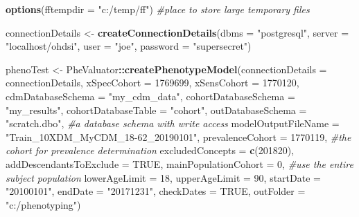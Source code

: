 \documentclass[
]{article}
\newenvironment{Shaded}{\begin{snugshade}}{\end{snugshade}}
\newcommand{\CommentTok}[1]{\textcolor[rgb]{0.56,0.35,0.01}{\textit{#1}}}
\newcommand{\DataTypeTok}[1]{\textcolor[rgb]{0.13,0.29,0.53}{#1}}
\newcommand{\DecValTok}[1]{\textcolor[rgb]{0.00,0.00,0.81}{#1}}
\newcommand{\KeywordTok}[1]{\textcolor[rgb]{0.13,0.29,0.53}{\textbf{#1}}}
\newcommand{\NormalTok}[1]{#1}
\newcommand{\OperatorTok}[1]{\textcolor[rgb]{0.81,0.36,0.00}{\textbf{#1}}}
\newcommand{\OtherTok}[1]{\textcolor[rgb]{0.56,0.35,0.01}{#1}}
\newcommand{\StringTok}[1]{\textcolor[rgb]{0.31,0.60,0.02}{#1}}
\begin{document}
\begin{Shaded}
\begin{Highlighting}[]
\KeywordTok{options}\NormalTok{(}\DataTypeTok{fftempdir =} \StringTok{"c:/temp/ff"}\NormalTok{) }\CommentTok{#place to store large temporary files}

\NormalTok{connectionDetails <-}\StringTok{ }\KeywordTok{createConnectionDetails}\NormalTok{(}\DataTypeTok{dbms =} \StringTok{"postgresql"}\NormalTok{,}
                                              \DataTypeTok{server =} \StringTok{"localhost/ohdsi"}\NormalTok{,}
                                              \DataTypeTok{user =} \StringTok{"joe"}\NormalTok{,}
                                              \DataTypeTok{password =} \StringTok{"supersecret"}\NormalTok{)}

\NormalTok{phenoTest <-}\StringTok{ }\NormalTok{PheValuator}\OperatorTok{::}\KeywordTok{createPhenotypeModel}\NormalTok{(}\DataTypeTok{connectionDetails =}\NormalTok{ connectionDetails,}
                           \DataTypeTok{xSpecCohort =} \DecValTok{1769699}\NormalTok{,}
                           \DataTypeTok{xSensCohort =} \DecValTok{1770120}\NormalTok{, }
                           \DataTypeTok{cdmDatabaseSchema =} \StringTok{"my_cdm_data"}\NormalTok{,}
                           \DataTypeTok{cohortDatabaseSchema =} \StringTok{"my_results"}\NormalTok{,}
                           \DataTypeTok{cohortDatabaseTable =} \StringTok{"cohort"}\NormalTok{,}
                           \DataTypeTok{outDatabaseSchema =} \StringTok{"scratch.dbo"}\NormalTok{, }\CommentTok{#a database schema with write access}
                           \DataTypeTok{modelOutputFileName =} \StringTok{"Train_10XDM_MyCDM_18-62_20190101"}\NormalTok{,}
                           \DataTypeTok{prevalenceCohort =} \DecValTok{1770119}\NormalTok{, }\CommentTok{#the cohort for prevalence determination}
                           \DataTypeTok{excludedConcepts =} \KeywordTok{c}\NormalTok{(}\DecValTok{201820}\NormalTok{), }
                           \DataTypeTok{addDescendantsToExclude =} \OtherTok{TRUE}\NormalTok{,}
                           \DataTypeTok{mainPopulationCohort =} \DecValTok{0}\NormalTok{, }\CommentTok{#use the entire subject population}
                           \DataTypeTok{lowerAgeLimit =} \DecValTok{18}\NormalTok{, }
                           \DataTypeTok{upperAgeLimit =} \DecValTok{90}\NormalTok{,}
                           \DataTypeTok{startDate =} \StringTok{"20100101"}\NormalTok{,}
                           \DataTypeTok{endDate =} \StringTok{"20171231"}\NormalTok{,}
                           \DataTypeTok{checkDates =} \OtherTok{TRUE}\NormalTok{,}
                           \DataTypeTok{outFolder =} \StringTok{"c:/phenotyping"}\NormalTok{)}
\end{Highlighting}
\end{Shaded}
\end{document}
